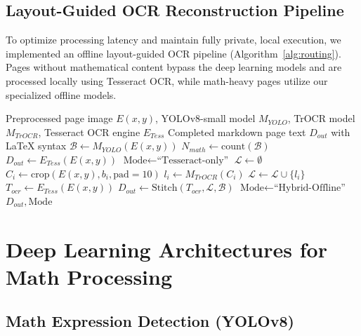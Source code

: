 \documentclass[conference]{IEEEtran}
\begin{document}
\subsection{Layout-Guided OCR Reconstruction Pipeline}

To optimize processing latency and maintain fully private, local execution, we implemented an offline layout-guided OCR pipeline (Algorithm~\ref{alg:routing}). Pages without mathematical content bypass the deep learning models and are processed locally using Tesseract OCR, while math-heavy pages utilize our specialized offline models.

\begin{algorithm}
\caption{SmartScan Layout-Guided LaTeX OCR Pipeline}
\label{alg:routing}
\begin{algorithmic}[1]
\REQUIRE Preprocessed page image $E(x,y)$, YOLOv8-small model $M_{YOLO}$, TrOCR model $M_{TrOCR}$, Tesseract OCR engine $E_{Tess}$
\ENSURE Completed markdown page text $D_{out}$ with LaTeX syntax
\STATE $\mathcal{B} \leftarrow M_{YOLO}(E(x,y))$ 
\STATE $N_{math} \leftarrow \text{count}(\mathcal{B})$
    \STATE $D_{out} \leftarrow E_{Tess}(E(x,y))$ 
    \STATE $\text{Mode} \leftarrow \text{``Tesseract-only''}$
\ELSE
    \STATE $\mathcal{L} \leftarrow \emptyset$
        \STATE $C_i \leftarrow \text{crop}(E(x,y), b_i, \text{pad}=10)$
        \STATE $l_i \leftarrow M_{TrOCR}(C_i)$ 
        \STATE $\mathcal{L} \leftarrow \mathcal{L} \cup \{l_i\}$
    \ENDFOR
    \STATE $T_{ocr} \leftarrow E_{Tess}(E(x,y))$ 
    \STATE $D_{out} \leftarrow \text{Stitch}(T_{ocr}, \mathcal{L}, \mathcal{B})$ 
    \STATE $\text{Mode} \leftarrow \text{``Hybrid-Offline''}$
\ENDIF
\RETURN $D_{out}, \text{Mode}$
\end{algorithmic}
\end{algorithm}

\section{Deep Learning Architectures for Math Processing}
\label{sec:deep_learning}

\subsection{Math Expression Detection (YOLOv8)}
\end{document}
